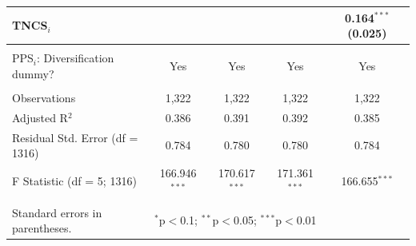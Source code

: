 \documentclass[draft,final]{vutinfth} %
\begin{document}
\begin{table}[!htbp]
\begin{tabularx}{\textwidth}{@{\extracolsep{\fill}}lcccc}
  TNCS$_{i}$ &  &  &  & 0.164$^{***}$ (0.025) \\ 
 \hline \\[-1.8ex] 
PPS$_{i}$: Diversification dummy? & Yes & Yes & Yes & Yes \\ 
\hline \\[-1.8ex] 
Observations & 1,322 & 1,322 & 1,322 & 1,322 \\ 
Adjusted R$^{2}$ & 0.386 & 0.391 & 0.392 & 0.385 \\ 
Residual Std. Error (df = 1316) & 0.784 & 0.780 & 0.780 & 0.784 \\ 
F Statistic (df = 5; 1316) & 166.946$^{***}$ & 170.617$^{***}$ & 171.361$^{***}$ & 166.655$^{***}$ \\ 
\hline 
\hline \\[-1.8ex] 
Standard errors in parentheses. & \multicolumn{4}{l}{$^{*}$p$<$0.1; $^{**}$p$<$0.05; $^{***}$p$<$0.01} \\ 
\end{tabularx}
\end{table} 
\end{document}
